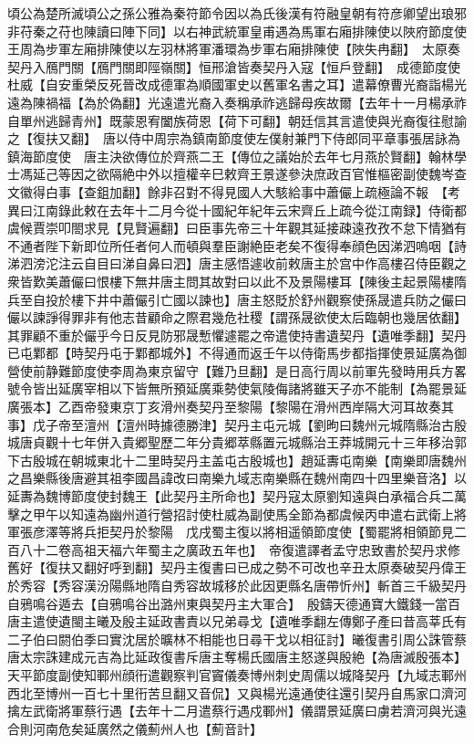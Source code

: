 頃公為楚所滅頃公之孫公雅為秦符節令因以為氏後漢有符融皇朝有符彦卿望出琅邪非苻秦之苻也陳讀曰陣下同】以右神武統軍皇甫遇為馬軍右廂排陳使以陜府節度使王周為步軍左廂排陳使以左羽林將軍潘環為步軍右廂排陳使【陜失冉翻】　太原奏契丹入鴈門關【鴈門關即陘嶺關】恒邢滄皆奏契丹入寇【恒戶登翻】　成德節度使杜威【自安重榮反死晉改成德軍為順國軍史以舊軍名書之耳】遣幕僚曹光裔詣楊光遠為陳禍福【為於偽翻】光遠遣光裔入奏稱承祚逃歸母疾故爾【去年十一月楊承祚自單州逃歸青州】既蒙恩宥闔族荷恩【荷下可翻】朝廷信其言遣使與光裔復往慰諭之【復扶又翻】　唐以侍中周宗為鎮南節度使左僕射兼門下侍郎同平章事張居詠為鎮海節度使　唐主決欲傳位於齊燕二王【傳位之議始於去年七月燕於賢翻】翰林學士馮延己等因之欲隔絶中外以擅權辛巳敕齊王景遂參決庶政百官惟樞密副使魏岑查文徽得白事【查鉏加翻】餘非召對不得見國人大駭給事中蕭儼上疏極論不報　【考異曰江南錄此敕在去年十二月今從十國紀年紀年云宋齊丘上疏今從江南録】侍衛都虞候賈崇叩閤求見【見賢遍翻】曰臣事先帝三十年觀其延接疎遠孜孜不怠下情猶有不通者陛下新即位所任者何人而頓與羣臣謝絶臣老矣不復得奉顔色因涕泗嗚咽【詩涕泗滂沱注云自目曰涕自鼻曰泗】唐主感悟遽收前敕唐主於宫中作高樓召侍臣觀之衆皆歎美蕭儼曰恨樓下無井唐主問其故對曰以此不及景陽樓耳【陳後主起景陽樓隋兵至自投於樓下井中蕭儼引亡國以諫也】唐主怒貶於舒州觀察使孫晟遣兵防之儼曰儼以諫諍得罪非有他志昔顧命之際君幾危社稷【謂孫晟欲使太后臨朝也幾居依翻】其罪顧不重於儼乎今日反見防邪晟慙懼遽罷之帝遣使持書遺契丹【遺唯季翻】契丹已屯鄴都【時契丹屯于鄴都城外】不得通而返壬午以侍衛馬步都指揮使景延廣為御營使前静難節度使李周為東京留守【難乃旦翻】是日高行周以前軍先發時用兵方畧號令皆出延廣宰相以下皆無所預延廣乘勢使氣陵侮諸將雖天子亦不能制【為罷景延廣張本】乙酉帝發東京丁亥滑州奏契丹至黎陽【黎陽在滑州西岸隔大河耳故奏其事】戊子帝至澶州【澶州時據德勝津】契丹主屯元城【劉昫曰魏州元城隋縣治古殷城唐貞觀十七年併入貴郷聖歷二年分貴郷萃縣置元城縣治王莽城開元十三年移治郭下古殷城在朝城東北十二里時契丹主盖屯古殷城也】趙延夀屯南樂【南樂即唐魏州之昌樂縣後唐避其祖李國昌諱改曰南樂九域志南樂縣在魏州南四十四里樂音洛】以延夀為魏博節度使封魏王【此契丹主所命也】契丹寇太原劉知遠與白承福合兵二萬擊之甲午以知遠為幽州道行營招討使杜威為副使馬全節為都虞候丙申遣右武衛上將軍張彦澤等將兵拒契丹於黎陽　戊戌蜀主復以將相遥領節度使【蜀罷將相領節見二百八十二卷高祖天福六年蜀主之廣政五年也】　帝復遣譯者孟守忠致書於契丹求修舊好【復扶又翻好呼到翻】契丹主復書曰已成之勢不可改也辛丑太原奏破契丹偉王於秀容【秀容漢汾陽縣地隋自秀容故城移於此因更縣名唐帶忻州】斬首三千級契丹自鴉鳴谷遁去【自鴉鳴谷出潞州東與契丹主大軍合】　殷鑄天德通寶大鐵錢一當百　唐主遣使遺閩主曦及殷主延政書責以兄弟尋戈【遺唯季翻左傳鄭子產曰昔高莘氏有二子伯曰閼伯季曰實沈居於曠林不相能也日尋干戈以相征討】曦復書引周公誅管蔡唐太宗誅建成元吉為比延政復書斥唐主奪楊氏國唐主怒遂與殷絶【為唐滅殷張本】　天平節度副使知鄆州顔衎遣觀察判官竇儀奏博州刺史周儒以城降契丹【九域志鄆州西北至博州一百七十里衎苦旦翻又音侃】又與楊光遠通使往還引契丹自馬家口濟河擒左武衛將軍蔡行遇【去年十二月遣蔡行遇戍鄆州】儀謂景延廣曰虜若濟河與光遠合則河南危矣延廣然之儀薊州人也【薊音計】

